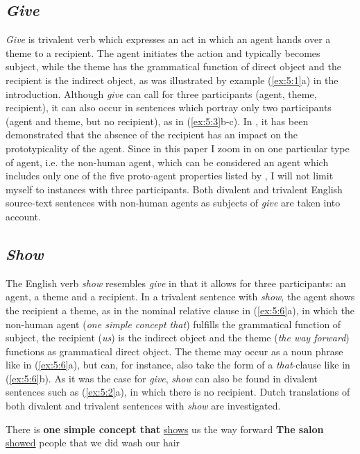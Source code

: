 \documentclass[output=paper]{LSP/langsci}
\begin{document}
\subsection{\textit{Give}}

\textit{Give} is trivalent verb which expresses an act in which an agent hands over a theme to a recipient. The agent initiates the action and typically becomes subject, while the theme has the grammatical function of direct object and the recipient is the indirect object, as was illustrated by example (\ref{ex:5:1}a) in the introduction. Although \textit{give} can call for three participants (agent, theme, recipient), it can also occur in sentences which portray only two participants (agent and theme, but no recipient), as in (\ref{ex:5:3}b-c). In , it has been demonstrated that the absence of the recipient has an impact on the prototypicality of the agent. Since in this paper I zoom in on one particular type of agent, i.e. the non-human agent, which can be considered an agent which includes only one of  the five proto-agent properties listed by \citet{Dowty1991}, I will not limit myself to instances with three participants. Both divalent and trivalent English source-text sentences with non-human agents as subjects of \textit{give} are taken into account.

\subsection{\textit{Show}}

The English verb \textit{show} resembles \textit{give} in that it allows for three participants: an agent, a theme and a recipient. In a trivalent sentence with \textit{show}, the agent shows the recipient a theme, as in the nominal relative clause in (\ref{ex:5:6}a), in which the non-human agent (\textit{one simple concept that}) fulfills the grammatical function of subject, the recipient (\textit{us}) is the indirect object and the theme (\textit{the way forward}) functions as grammatical direct object. The theme may occur as a noun phrase like in (\ref{ex:5:6}a), but can, for instance, also take the form of a \textit{that}-clause like in (\ref{ex:5:6}b). As it was the case for \textit{give}, \textit{show} can also be found in divalent sentences such as (\ref{ex:5:2}a), in which there is no recipient. Dutch translations of both divalent and trivalent sentences with \textit{show} are investigated.

\ea \label{ex:5:6}
\ea There is \textbf{one simple concept that} \ul{shows} us the way forward
\ex \textbf{The salon} \ul{showed} people that we did wash our hair
\z
\z
\end{document}
